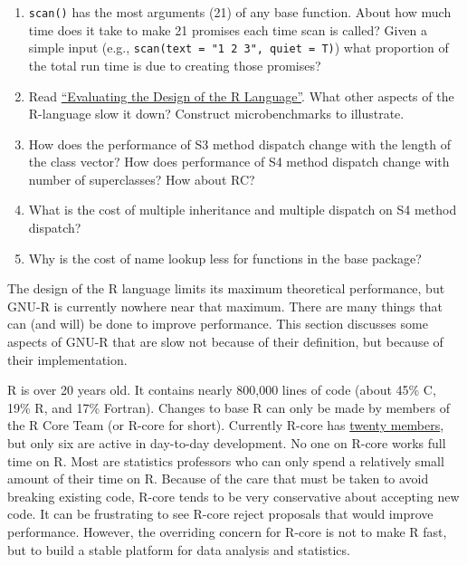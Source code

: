 \begin{enumerate}
\def\labelenumi{\arabic{enumi}.}
\item
  \texttt{scan()} has the most arguments (21) of any base function.
  About how much time does it take to make 21 promises each time scan is
  called? Given a simple input (e.g.,
  \texttt{scan(text = "1 2 3", quiet = T)}) what proportion of the total
  run time is due to creating those promises?
\item
  Read \href{http://r.cs.purdue.edu/pub/ecoop12.pdf}{``Evaluating the
  Design of the R Language''}. What other aspects of the R-language slow
  it down? Construct microbenchmarks to illustrate.
\item
  How does the performance of S3 method dispatch change with the length
  of the class vector? How does performance of S4 method dispatch change
  with number of superclasses? How about RC?
\item
  What is the cost of multiple inheritance and multiple dispatch on S4
  method dispatch?
\item
  Why is the cost of name lookup less for functions in the base package?
\end{enumerate}


The design of the R language limits its maximum theoretical performance,
but GNU-R is currently nowhere near that maximum. There are many things
that can (and will) be done to improve performance. This section
discusses some aspects of GNU-R that are slow not because of their
definition, but because of their implementation.

R is over 20 years old. It contains nearly 800,000 lines of code (about
45\% C, 19\% R, and 17\% Fortran). Changes to base R can only be made by
members of the R Core Team (or R-core for short). Currently R-core has
\href{http://www.r-project.org/contributors.html}{twenty members}, but
only six are active in day-to-day development. No one on R-core works
full time on R. Most are statistics professors who can only spend a
relatively small amount of their time on R. Because of the care that
must be taken to avoid breaking existing code, R-core tends to be very
conservative about accepting new code. It can be frustrating to see
R-core reject proposals that would improve performance. However, the
overriding concern for R-core is not to make R fast, but to build a
stable platform for data analysis and statistics. 

